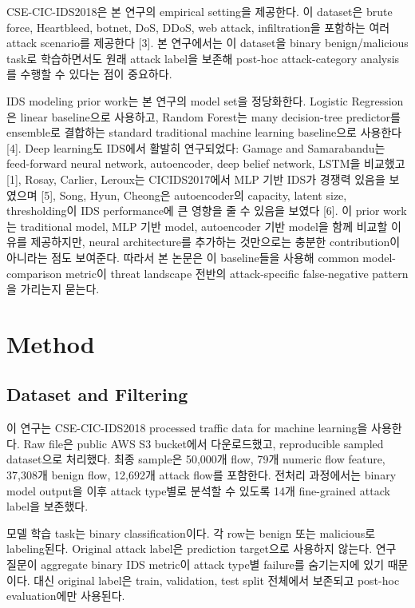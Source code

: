 \documentclass[sigconf,nonacm]{acmart}
\begin{document}
CSE-CIC-IDS2018은 본 연구의 empirical setting을 제공한다.
이 dataset은 brute force, Heartbleed, botnet, DoS, DDoS, web attack, infiltration을 포함하는 여러 attack scenario를 제공한다 [3].
본 연구에서는 이 dataset을 binary benign/malicious task로 학습하면서도 원래 attack label을 보존해 post-hoc attack-category analysis를 수행할 수 있다는 점이 중요하다.

IDS modeling prior work는 본 연구의 model set을 정당화한다.
Logistic Regression은 linear baseline으로 사용하고, Random Forest는 many decision-tree predictor를 ensemble로 결합하는 standard traditional machine learning baseline으로 사용한다 [4].
Deep learning도 IDS에서 활발히 연구되었다: Gamage and Samarabandu는 feed-forward neural network, autoencoder, deep belief network, LSTM을 비교했고 [1], Rosay, Carlier, Leroux는 CICIDS2017에서 MLP 기반 IDS가 경쟁력 있음을 보였으며 [5], Song, Hyun, Cheong은 autoencoder의 capacity, latent size, thresholding이 IDS performance에 큰 영향을 줄 수 있음을 보였다 [6].
이 prior work는 traditional model, MLP 기반 model, autoencoder 기반 model을 함께 비교할 이유를 제공하지만, neural architecture를 추가하는 것만으로는 충분한 contribution이 아니라는 점도 보여준다.
따라서 본 논문은 이 baseline들을 사용해 common model-comparison metric이 threat landscape 전반의 attack-specific false-negative pattern을 가리는지 묻는다.

\section{Method}

\subsection{Dataset and Filtering}

이 연구는 CSE-CIC-IDS2018 processed traffic data for machine learning을 사용한다.
Raw file은 public AWS S3 bucket에서 다운로드했고, reproducible sampled dataset으로 처리했다.
최종 sample은 50,000개 flow, 79개 numeric flow feature, 37,308개 benign flow, 12,692개 attack flow를 포함한다.
전처리 과정에서는 binary model output을 이후 attack type별로 분석할 수 있도록 14개 fine-grained attack label을 보존했다.

모델 학습 task는 binary classification이다.
각 row는 benign 또는 malicious로 labeling된다.
Original attack label은 prediction target으로 사용하지 않는다.
연구 질문이 aggregate binary IDS metric이 attack type별 failure를 숨기는지에 있기 때문이다.
대신 original label은 train, validation, test split 전체에서 보존되고 post-hoc evaluation에만 사용된다.
\end{document}
